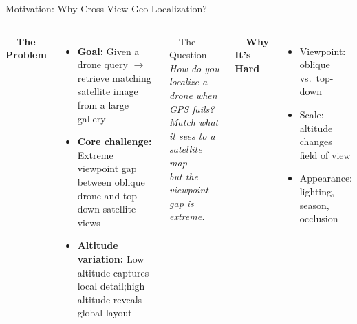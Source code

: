 \documentclass[aspectratio=169, 11pt]{beamer}
\begin{document}
\begin{frame}{Motivation: Why Cross-View Geo-Localization?}
\begin{columns}[T]
\vspace{0.2cm}
{\large \textbf{\faCrosshairs\ \ The Problem}}
\vspace{0.2cm}

\begin{itemize}
  \setlength\itemsep{0.6em}
  \item \textbf{Goal:} Given a drone query $\rightarrow$ retrieve matching satellite image from a large gallery
  \item \textbf{Core challenge:} Extreme viewpoint gap between oblique drone and top-down satellite views
  \item \textbf{Altitude variation:} Low altitude captures local detail;high altitude reveals global layout
\end{itemize}

\vspace{0.2cm}
\begin{exampleblock}{\faLightbulb\ \ The Question}
  \itshape How do you localize a drone when GPS fails?\\
  Match what it sees to a satellite map ---\\
  but the viewpoint gap is extreme.
\end{exampleblock}

\vspace{0.3cm}
{\large \textbf{\faExclamation\ \ Why It's Hard}}
\vspace{0.1cm}
\begin{itemize}
  \item Viewpoint: oblique vs.\ top-down
  \item Scale: altitude changes field of view
  \item Appearance: lighting, season, occlusion
\end{itemize}
\end{columns}
\end{frame}
\end{document}
